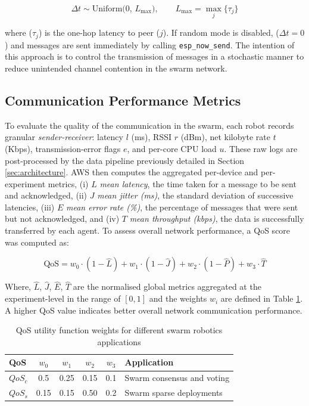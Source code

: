 \documentclass[conference]{IEEEtran}
\begin{document}
\begin{equation}\label{alg:transmission_freq}
\Delta t \sim \mathrm{Uniform}\bigl(0,\,L_{\max}\bigr), 
\qquad
L_{\max} = \max_{j}\{\tau_{j}\}
\end{equation}

where ($\tau_{j}$) is the one-hop latency to peer ($j$). If random mode is disabled, ($\Delta t = 0$) and messages are sent immediately by calling \texttt{esp\_now\_send}. The intention of this approach is to control the transmission of messages in a stochastic manner to reduce unintended channel contention in the swarm network.

\subsection{Communication Performance Metrics}\label{sec:evaluation-metrics}

To evaluate the quality of the communication in the swarm, each robot records granular \emph{sender-receiver}: latency $l$ (ms), RSSI $r$ (dBm), net kilobyte rate $t$ (Kbps), transmission-error flags $e$, and per-core CPU load $u$. These raw logs are post-processed by the data pipeline previously detailed in Section \ref{sec:architecture}. AWS then computes the aggregated per-device and per-experiment metrics, (i) $L$ \emph{mean latency}, the time taken for a message to be sent and acknowledged, (ii) $J$ \emph{mean jitter (ms)}, the standard deviation of successive latencies, (iii) $E$ \emph{mean error rate (\%)}, the percentage of messages that were sent but not acknowledged, and (iv) $T$ \emph{mean throughput (kbps)}, the data is successfully transferred by each agent. To assess overall network performance, a QoS score was computed as:

\begin{equation}
\mathrm{QoS} = w_0 \cdot (1 - \hat{L}) + w_1 \cdot (1 - \hat{J}) + w_2 \cdot (1 - \hat{P}) + w_3 \cdot \hat{T}
\end{equation}

Where, $\hat{L}$, $\hat{J}$, $\hat{E}$, $\hat{T}$ are the normalised global metrics aggregated at the experiment-level in the range of $[0,1]$ and the weights $w_i$ are defined in Table \ref{tab:qos}. A higher QoS value indicates better overall network communication performance. %

\begin{table}[H]
\centering
\caption{QoS utility function weights for different swarm robotics applications}
\label{tab:qos}
  \begin{tabular}{@{} lcccc p{3.5cm} @{}}
  \toprule
  \textbf{QoS} & \textbf{$w_0$} & \textbf{$w_1$} & \textbf{$w_2$} & \textbf{$w_3$} & \textbf{Application} \\
  \midrule
  $QoS_c$      & 0.5  & 0.25   & 0.15   & 0.1     & Swarm consensus and voting     \\
  $QoS_s$      & 0.15 & 0.15   & 0.50   & 0.2     & Swarm sparse deployments       \\
  \bottomrule
  \end{tabular}
\end{table}
\end{document}
